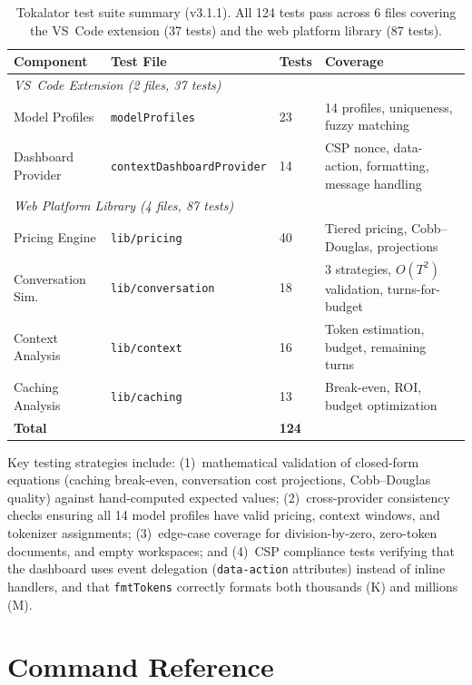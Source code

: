 \documentclass[a4paper,fleqn]{cas-dc}
\begin{document}
\begin{table}[htp!]
\centering
\small
\begin{tabular}{|l|l|p{0.8cm}|p{3.5cm}|}
\hline
\textbf{Component} & \textbf{Test File} & \textbf{Tests} & \textbf{Coverage} \\
\hline
\multicolumn{4}{|l|}{\textit{VS~Code Extension (2 files, 37 tests)}} \\
\hline
Model Profiles & \texttt{modelProfiles} & 23 & 14 profiles, uniqueness, fuzzy matching \\
\hline
Dashboard Provider & \texttt{contextDashboardProvider} & 14 & CSP nonce, data-action, formatting, message handling \\
\hline
\multicolumn{4}{|l|}{\textit{Web Platform Library (4 files, 87 tests)}} \\
\hline
Pricing Engine & \texttt{lib/pricing} & 40 & Tiered pricing, Cobb--Douglas, projections \\
\hline
Conversation Sim. & \texttt{lib/conversation} & 18 & 3 strategies, $O(T^2)$ validation, turns-for-budget \\
\hline
Context Analysis & \texttt{lib/context} & 16 & Token estimation, budget, remaining turns \\
\hline
Caching Analysis & \texttt{lib/caching} & 13 & Break-even, ROI, budget optimization \\
\hline
\multicolumn{2}{|l|}{\textbf{Total}} & \textbf{124} & \\
\hline
\end{tabular}
\caption{Tokalator test suite summary (v3.1.1). All 124 tests pass across 6 files covering the VS~Code extension (37 tests) and the web platform library (87 tests).}
\label{tab:tests}
\end{table}

Key testing strategies include: (1)~mathematical validation of closed-form equations (caching break-even, conversation cost projections, Cobb--Douglas quality) against hand-computed expected values; (2)~cross-provider consistency checks ensuring all 14 model profiles have valid pricing, context windows, and tokenizer assignments; (3)~edge-case coverage for division-by-zero, zero-token documents, and empty workspaces; and (4)~CSP compliance tests verifying that the dashboard uses event delegation (\texttt{data-action} attributes) instead of inline handlers, and that \texttt{fmtTokens} correctly formats both thousands (K) and millions (M).

\section{Command Reference}
\label{app:commands}
\end{document}
